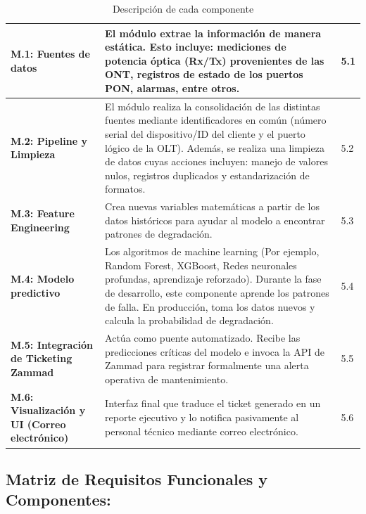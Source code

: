 \documentclass[12pt,a4paper]{article}
\begin{document}
\begin{table}[H]
\begin{tabularx}{\textwidth}{|p{3.5cm}|X|p{2cm}|}
                            \textbf{M.1: Fuentes de datos} & El módulo extrae la información de manera estática. Esto incluye: mediciones de potencia óptica (Rx/Tx) provenientes de las ONT, registros de estado de los puertos PON, alarmas, entre otros. & 5.1 \\ \hline
                            \textbf{M.2: Pipeline y Limpieza} & El módulo realiza la consolidación de las distintas fuentes mediante identificadores en común (número serial del dispositivo/ID del cliente y el puerto lógico de la OLT). Además, se realiza una limpieza de datos cuyas acciones incluyen: manejo de valores nulos, registros duplicados y estandarización de formatos. & 5.2 \\ \hline
                            \textbf{M.3: Feature Engineering} & Crea nuevas variables matemáticas a partir de los datos históricos para ayudar al modelo a encontrar patrones de degradación. & 5.3 \\ \hline
                            \textbf{M.4: Modelo predictivo} & Los algoritmos de machine learning (Por ejemplo, Random Forest, XGBoost, Redes neuronales profundas, aprendizaje reforzado). Durante la fase de desarrollo, este componente aprende los patrones de falla. En producción, toma los datos nuevos y calcula la probabilidad de degradación. & 5.4 \\ \hline
                            \textbf{M.5: Integración de Ticketing Zammad} & Actúa como puente automatizado. Recibe las predicciones críticas del modelo e invoca la API de Zammad para registrar formalmente una alerta operativa de mantenimiento. & 5.5 \\ \hline
                            \textbf{M.6: Visualización y UI (Correo electrónico)} & Interfaz final que traduce el ticket generado en un reporte ejecutivo y lo notifica pasivamente al personal técnico mediante correo electrónico. & 5.6 \\ \hline
                        \end{tabularx}
                        \caption{Descripción de cada componente}
                        \label{Tabla MODULO}
                    \end{table}


                
    \subsection{\textbf{Matriz de Requisitos Funcionales y Componentes:}}
                
\end{document}
